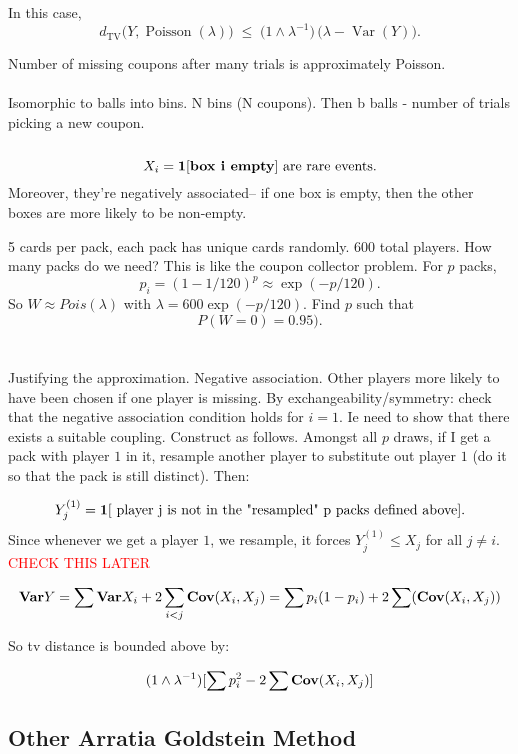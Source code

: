 \documentclass{article}
\newcommand\myworries[1]{\textcolor{red}{#1}}
\begin{document}
In this case,
\[
  d_{\mathrm{TV}}\!\bigl(Y, \operatorname{Poisson}(\lambda)\bigr)
  \;\le\;
  \bigl(1 \wedge \lambda^{-1}\bigr)\,
  \bigl(\lambda - \operatorname{Var}(Y)\bigr).
\]

\begin{example}
Number of missing coupons after many trials is approximately Poisson. \\\\
Isomorphic to balls into bins. N bins (N coupons). Then b balls - number of trials picking a new coupon. \\\\

$$X_i = \boldsymbol{1}[\textbf{box i empty}] \text{ are rare events}.$$
Moreover, they're negatively associated-- if one box is empty, then the other boxes are more likely to be non-empty. 
\end{example}

\begin{example}
5 cards per pack, each pack has unique cards randomly. 600 total players. How many packs do we need? This is like the coupon collector problem. 
For $p$ packs, 
$$p_i = (1- 1/120)^p \approx \exp(-p/120).$$
So $W\approx Pois(\lambda)$ with $\lambda = 600\exp(-p/120)$. 
Find $p$ such that
$$P(W = 0) = 0.95).$$\\\\
Justifying the approximation. Negative association. Other players more likely to have been chosen if one player is missing. By exchangeability/symmetry: check that the negative association condition holds for $i=1$. Ie need to show that there exists a suitable coupling. Construct as follows. Amongst all $p$ draws, if I get a pack with player $1$ in it, resample another player to substitute out player $1$ (do it so that the pack is still distinct). Then:

$$Y_{j}^{(1)} = \boldsymbol{1}[ \text{ player j is not in the "resampled" p packs defined above}].$$
Since whenever we get a player $1$, we resample, it forces $Y_{j}^{(1)} \leq X_j$ for all $j\neq i$. \myworries{CHECK THIS LATER}

$$\mathbf{Var} Y = \sum \mathbf{Var} X_i + 2\sum_{i<j} \mathbf{Cov}(X_i, X_j) = \sum p_i(1-p_i) + 2\sum (\mathbf{Cov} (X_i, X_j))$$

So tv distance is bounded above by:

$$(1\wedge \lambda^{-1} ) [\sum p_i^2 - 2\sum \mathbf{Cov} (X_i, X_j)]$$
\end{example}

\subsection{Other Arratia Goldstein Method}
\end{document}
